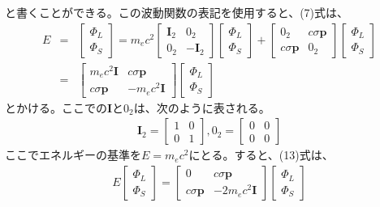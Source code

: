 \documentclass[10pt]{jreport}
\begin{document}
と書くことができる。この波動関数の表記を使用すると、(7)式は、
\begin{eqnarray}
E &=&\left [
\begin{array}{r}
\Phi_L \\
\Phi_S 
\end{array} 
\right ] = m_e c^2 \left [
\begin{array}{rr}
\textbf{I}_2 & 0_2 \\
0_2 & -\textbf{I}_2 
\end{array}
\right ] \left [
\begin{array}{r}
\Phi_L \\
\Phi_S
\end{array}
\right ] + \left [
\begin{array}{rr}
0_2 & c\sigma \textbf{p} \\
c\sigma \textbf{p} & 0_2 
\end{array}
\right ] \left [
\begin{array}{r}
\Phi_L \\
\Phi_S
\end{array}
\right ] \nonumber \\
&=& \left [
\begin{array}{rr}
m_ec^2 \textbf{I} & c\sigma \textbf{p} \\
c\sigma \textbf{p} & -m_ec^2 \textbf{I} 
\end{array}
\right ] \left [
\begin{array}{r}
\Phi_L \\
\Phi_S
\end{array}
\right ]
\end{eqnarray}
とかける。ここでの$\textbf{I}$と$0_2$は、次のように表される。
\begin{eqnarray}
\textbf{I}_2 = \left [
\begin{array}{rr}
1 & 0 \\
0& 1 
\end{array} 
\right ] , 0_2 = \left [
\begin{array}{rr}
0 & 0 \\
0 & 0
\end{array}
\right ] \nonumber 
\end{eqnarray}
ここでエネルギーの基準を$ E =m_ec^2 $にとる。すると、(13)式は、
\begin{eqnarray}
E\left [
\begin{array}{r}
\Phi_L \\
\Phi_S
\end{array}
\right ] = \left [
\begin{array}{rr}
0 & c\sigma \textbf{p} \\
c\sigma \textbf{p} & -2m_ec^2 \textbf{I} 
\end{array}
\right ] \left [
\begin{array}{r}
\Phi_L \\
\Phi_S
\end{array}
\right ]
\end{eqnarray}
\end{document}
